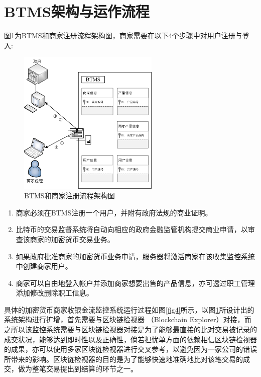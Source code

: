 \section{BTMS架构与运作流程}

	图\ref{fig3}为BTMS和商家注册流程架构图，商家需要在以下4个步骤中对用户注册与登入:

	\begin{figure}[!htbp]
		\centering
		\includegraphics[width = 0.6\textwidth]{fig3.jpg}
		\caption{BTMS和商家注册流程架构图}\label{fig3}
	\end{figure}

	\begin{enumerate}
		\item 商家必须在BTMS注册一个用户，并附有政府法规的商业证明。
		\item 比特币的交易监督系统将自动向相应的政府金融监管机构提交商业申请，以审查该商家的加密货币交易业务。
		\item 如果政府批准商家的加密货币业务申请，服务器将激活商家在该收集监控系统中创建商家用户。
		\item 商家可以自由地登入帐户并添加商家想要出售的产品信息，亦可透过职工管理添加修改删除职工信息。
	\end{enumerate}

	具体的加密货币商家收银金流监控系统运行过程如图\ref{fig4}所示，以图\ref{fig3}所设计出的系统架构进行扩增，首先需要与区块链检视器 （Blockchain Explorer）\supercite{Blockchainexplorer:Ananalyticalprocessandinvestigationenvironmentforbitcoin}对接，而之所以该监控系统需要与区块链检视器对接是为了能够最直接的比对交易被记录的成交状况，能够达到即时性以及正确性，倘若担忧单方面的依赖相信区块链检视器的成果，亦可以使用多家区块链检视器进行交叉参考，以避免因为一家公司的错误所带来的影响。区块链检视器的目的是为了能够快速地准确地比对该笔交易的成交，做为整笔交易提出到结算的环节之一。

